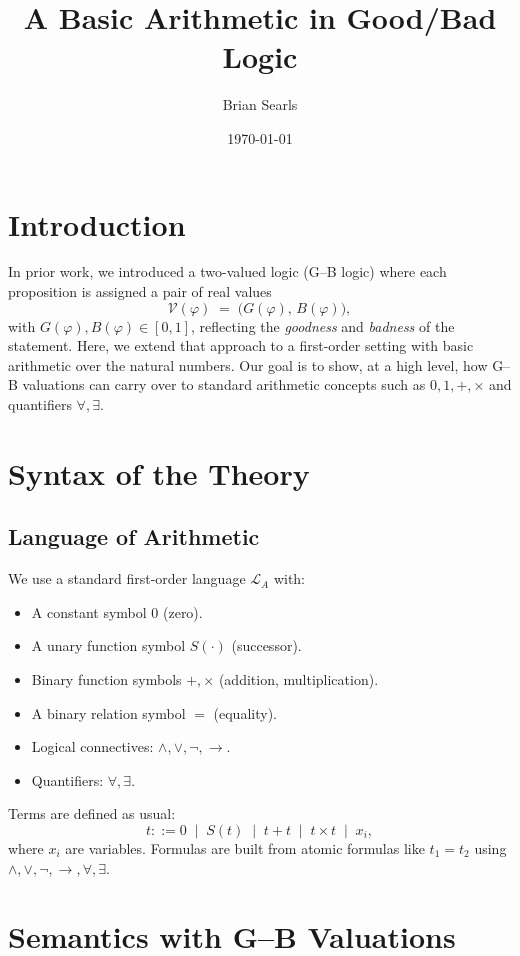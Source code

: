 \documentclass[11pt]{article}
\title{A Basic Arithmetic in Good/Bad Logic}
\author{Brian Searls}
\date{\today}
\begin{document}
\maketitle

\section{Introduction}

In prior work, we introduced a two-valued logic (G--B logic) where each proposition 
is assigned a pair of real values
\[
   \mathcal{V}(\varphi) \;=\; \bigl(G(\varphi),\,B(\varphi)\bigr),
\]
with $G(\varphi), B(\varphi) \in [0,1]$, reflecting the \emph{goodness} and \emph{badness} of the statement. 
Here, we extend that approach to a first-order setting with basic arithmetic over the natural numbers. 
Our goal is to show, at a high level, how G--B valuations can carry over to standard arithmetic 
concepts such as $0,1,+,\times$ and quantifiers $\forall,\exists$.

\section{Syntax of the Theory}

\subsection{Language of Arithmetic}

We use a standard first-order language $\mathcal{L}_A$ with:
\begin{itemize}
    \item A constant symbol $0$ (zero).
    \item A unary function symbol $S(\cdot)$ (successor).
    \item Binary function symbols $+,\times$ (addition, multiplication).
    \item A binary relation symbol $=$ (equality).
    \item Logical connectives: $\land,\lor,\lnot,\to$.
    \item Quantifiers: $\forall,\exists$.
\end{itemize}

Terms are defined as usual: 
\[
  t ::= 0 \;\mid\; S(t) \;\mid\; t + t \;\mid\; t \times t \;\mid\; x_i,
\]
where $x_i$ are variables. Formulas are built from atomic formulas like $t_1 = t_2$ using 
$\land,\lor,\lnot,\to,\forall,\exists$.

\section{Semantics with G--B Valuations}
\end{document}
